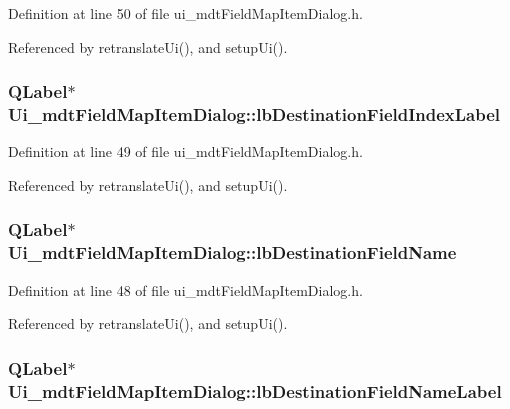 Definition at line 50 of file ui\-\_\-mdt\-Field\-Map\-Item\-Dialog.\-h.



Referenced by retranslate\-Ui(), and setup\-Ui().

\hypertarget{class_ui__mdt_field_map_item_dialog_ab5331766ed61e953ee49b3e06555f174}{
\subsubsection[{lb\-Destination\-Field\-Index\-Label}]{\setlength{\rightskip}{0pt plus 5cm}Q\-Label$\ast$ Ui\-\_\-mdt\-Field\-Map\-Item\-Dialog\-::lb\-Destination\-Field\-Index\-Label}}\label{class_ui__mdt_field_map_item_dialog_ab5331766ed61e953ee49b3e06555f174}


Definition at line 49 of file ui\-\_\-mdt\-Field\-Map\-Item\-Dialog.\-h.



Referenced by retranslate\-Ui(), and setup\-Ui().

\hypertarget{class_ui__mdt_field_map_item_dialog_a62b58e5f7e136007355ac558c9c0aa03}{
\subsubsection[{lb\-Destination\-Field\-Name}]{\setlength{\rightskip}{0pt plus 5cm}Q\-Label$\ast$ Ui\-\_\-mdt\-Field\-Map\-Item\-Dialog\-::lb\-Destination\-Field\-Name}}\label{class_ui__mdt_field_map_item_dialog_a62b58e5f7e136007355ac558c9c0aa03}


Definition at line 48 of file ui\-\_\-mdt\-Field\-Map\-Item\-Dialog.\-h.



Referenced by retranslate\-Ui(), and setup\-Ui().

\hypertarget{class_ui__mdt_field_map_item_dialog_a56d6141428c071bb547979d56a9f72ef}{
\subsubsection[{lb\-Destination\-Field\-Name\-Label}]{\setlength{\rightskip}{0pt plus 5cm}Q\-Label$\ast$ Ui\-\_\-mdt\-Field\-Map\-Item\-Dialog\-::lb\-Destination\-Field\-Name\-Label}}\label{class_ui__mdt_field_map_item_dialog_a56d6141428c071bb547979d56a9f72ef}


